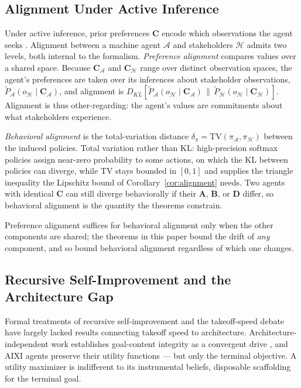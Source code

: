 \documentclass[runningheads]{llncs}
\begin{document}
\subsection{Alignment Under Active Inference}
\label{sec:alignment}
 
Under active inference, prior preferences $\mathbf{C}$ encode which observations the agent seeks \cite{parr2022,friston2015}. Alignment between a machine agent $\mathcal{A}$ and stakeholders $\mathcal{H}$ admits two levels, both internal to the formalism. \emph{Preference alignment} compares values over a shared space. Because $\mathbf{C}_\mathcal{A}$ and $\mathbf{C}_\mathcal{H}$ range over distinct observation spaces, the agent's preferences are taken over its inferences about stakeholder observations, $\tilde{P}_\mathcal{A}(o_\mathcal{H} \mid \mathbf{C}_\mathcal{A})$, and alignment is $D_{KL}[\tilde{P}_\mathcal{A}(o_\mathcal{H} \mid \mathbf{C}_\mathcal{A}) \,\|\, \tilde{P}_\mathcal{H}(o_\mathcal{H} \mid \mathbf{C}_\mathcal{H})]$. Alignment is thus other-regarding: the agent's values are commitments about what stakeholders experience.
 
\emph{Behavioral alignment} is the total-variation distance $\delta_\pi = \text{TV}(\pi_\mathcal{A}, \pi_\mathcal{H})$ between the induced policies. Total variation rather than KL: high-precision softmax policies assign near-zero probability to some actions, on which the KL between policies can diverge, while TV stays bounded in $[0,1]$ and supplies the triangle inequality the Lipschitz bound of Corollary~\ref{cor:alignment} needs. Two agents with identical $\mathbf{C}$ can still diverge behaviorally if their $\mathbf{A}$, $\mathbf{B}$, or $\mathbf{D}$ differ, so behavioral alignment is the quantity the theorems constrain.
 
Preference alignment suffices for behavioral alignment only when the other components are shared; the theorems in this paper bound the drift of \emph{any} component, and so bound behavioral alignment regardless of which one changes.
 
\subsection{Recursive Self-Improvement and the Architecture Gap}

Formal treatments of recursive self-improvement \cite{schmidhuber2007,wang2018,nivel2013} and the takeoff-speed debate \cite{christiano2018,yudkowsky2013} have largely lacked results connecting takeoff speed to architecture. Architecture-independent work establishes goal-content integrity as a convergent drive \cite{omohundro2008,bensontilsen2016}, and AIXI agents preserve their utility functions \cite{everitt2016} --- but only the terminal objective. A utility maximizer is indifferent to its instrumental beliefs, disposable scaffolding for the terminal goal.
\end{document}
